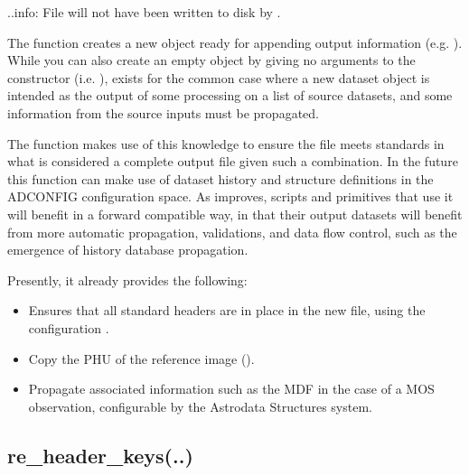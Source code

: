 \documentclass[letterpaper,10pt,english]{sphinxmanual}
\begin{document}
\begin{fulllineitems}
..info: File will not have been written to disk by .

The  function creates a new  object ready for
appending output information (e.g. ).  While you can also
create an empty  object by giving no arguments to the 
constructor  (i.e. ),  exists for the
common case where a new dataset object is intended as the output of
some processing on a list of source datasets, and some information
from the source inputs must be propagated.

The  function makes use of this knowledge to ensure the
file meets standards in what is considered a complete output file given
such a combination.  In the future this function can make use of dataset
history and structure definitions in the ADCONFIG configuration space. As
 improves, scripts and primitives that use it
will benefit in a forward compatible way, in that their output datasets will
benefit from more automatic propagation, validations, and data flow control,
such as the emergence of history database propagation.

Presently, it already provides the following:
\begin{itemize}
\item {} 
Ensures that all standard headers are in place in the new file, using the
configuration .

\item {} 
Copy the PHU of the reference image ().

\item {} 
Propagate associated information such as the MDF in the case of a MOS 
observation, configurable by the Astrodata Structures system.

\end{itemize}

\end{fulllineitems}



\subsection{re\_header\_keys(..)}
\label{chapter_AstroDataClass:re-header-keys}
\end{document}
